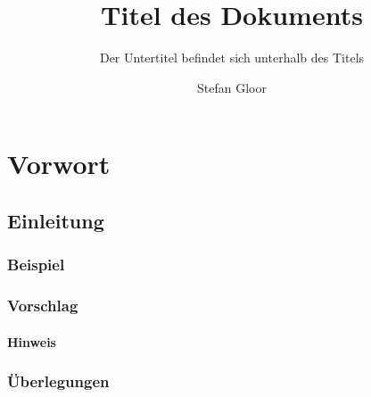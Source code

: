 \documentclass[a4paper]{book} %
\title{Titel des Dokuments}
\subtitle{Der Untertitel befindet sich unterhalb des Titels}
\author{Stefan Gloor}
\begin{document}
 
    \thispagestyle{TitlePageStyle} %
    \maketitle %
    \renewcommand{\cfttoctitlefont}{\sffamily \bfseries \Large}
    \renewcommand{\cftchapfont}{\sffamily \bfseries \large}
    \renewcommand{\cftsecfont}{\sffamily \bfseries}
    \renewcommand{\cftsubsecfont}{\sffamily}
    \renewcommand{\cftsubsubsecfont}{\sffamily}
    \renewcommand{\cftchappagefont}{\sffamily \bfseries \large}
    \renewcommand{\cftsecpagefont}{\sffamily \bfseries}
    \renewcommand{\cftsubsecpagefont}{\sffamily}
    \renewcommand{\cftsubsubsecpagefont}{\sffamily}
    \renewcommand{\cftchapaftersnum}{\bfseries\large.}
    \renewcommand{\cftsecaftersnum}{\bfseries.}
    \renewcommand{\cftsubsecaftersnum}{.}
    \renewcommand{\cftsubsubsecaftersnum}{.}
    \renewcommand{\cftbeforechapskip}{4mm}
    \renewcommand{\cftbeforesecskip}{2mm}
    \renewcommand{\cftbeforesubsecskip}{2mm}
    \renewcommand{\cftbeforesubsubsecskip}{2mm}
    \setlength{\cftbeforetoctitleskip}{0pt}
    \setlength{\cftaftertoctitleskip}{10pt}
    \tableofcontents
    \newpage
    


    \chapter{Vorwort}
         \section{Einleitung}
             \subsection{Beispiel}
                 \blindtext
            \subsection{Vorschlag}
                \blindtext
                \subsubsection{Hinweis}
                    \blindtext
            \subsection{Überlegungen}
                \blindmathpaper
\end{document}
